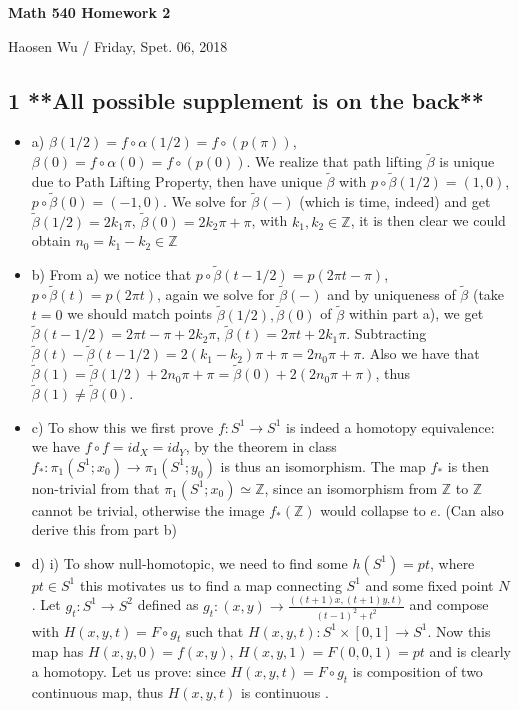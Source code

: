 \documentclass[11pt]{article}
\def\Z{{\mathbb Z}}
\theoremstyle{remark}
\begin{document}
\begin{center}
    \begin{Large} {\bf Math 540 Homework 2}\\
    \end{Large}
    Haosen Wu  / Friday, Spet. 06, 2018
\end{center}


\subsection*{1 **All possible supplement is on the back**}
\begin{itemize}
    \item a) $\beta(1/2)=f\circ \alpha(1/2)= f\circ (p(\pi))$, $\beta(0)=f\circ \alpha(0)= f\circ (p(0))$. We realize that path lifting $\tilde{\beta}$ is unique due to Path Lifting Property, then have unique $\tilde{\beta}$ with $p\circ \tilde{\beta}(1/2)= (1,0)$, $p\circ \tilde{\beta}(0)= (-1,0)$. We solve for $\tilde{\beta}(-)$ (which is time, indeed) and get $\tilde{\beta}(1/2)=2k_1\pi$, $\tilde{\beta}(0)=2k_2\pi+\pi$, with $k_1,k_2 \in \Z$, it is then clear we could obtain $n_0=k_1-k_2 \in \Z$
    
    \item b) From a) we notice that $p\circ \tilde{\beta}(t-1/2)= p(2\pi t-\pi)$, $p\circ \tilde{\beta}(t)= p(2\pi t)$, again we solve for $\tilde{\beta}(-)$ and by uniqueness of $\tilde{\beta}$ (take $t=0$ we should match points $\tilde{\beta}(1/2),\tilde{\beta}(0)$ of $\tilde{\beta}$ within part a), we get $\tilde{\beta}(t-1/2)=2\pi t-\pi+2k_2\pi$, $\tilde{\beta}(t)=2\pi t+2k_1\pi$. Subtracting $\tilde{\beta}(t)-\tilde{\beta}(t-1/2)=2(k_1-k_2)\pi+\pi = 2n_0\pi+\pi$. Also we have that $\tilde{\beta}(1)=\tilde{\beta}(1/2)+2n_0\pi+\pi=\tilde{\beta}(0)+2(2n_0\pi+\pi)$, thus $\tilde{\beta}(1)\neq\tilde{\beta}(0) $.
    
    \item c) To show this we first prove $f:S^1\rightarrow S^1$ is indeed a homotopy equivalence: we have $f\circ f = id_X = id_Y$,     by the theorem in class $f_*: \pi_1(S^1;x_0) \rightarrow \pi_1(S^1;y_0)$ is thus an isomorphism. The map $f_*$ is then non-trivial from that $\pi_1(S^1;x_0) \simeq \Z$, since an isomorphism from $\Z $ to $\Z $ cannot be trivial, otherwise the image $f_* (\Z) $  would collapse to {$e$}. (Can also derive this from part b)
    
    \item d) 
         i) To show null-homotopic, we need to find some $h(S^1)={pt}$, where $pt \in S^1$ this motivates us to find a map connecting $S^1$ and some fixed point $N$. Let $g_t:S^1\rightarrow S^2$ defined as $g_t:(x,y)\rightarrow \frac{((t+1)x,(t+1)y,t)}{(t-1)^2+t^2}$ and compose with $H(x,y,t)=F\circ g_t$ such that $H(x,y,t):S^1\times[0,1]\rightarrow S^1$. Now this map has $H(x,y,0)=f(x,y)$, $H(x,y,1)=F(0,0,1)={pt}$ and is clearly a homotopy. Let us prove: since $H(x,y,t)=F\circ g_t$ is composition of two continuous map, thus $H(x,y,t)$ is continuous .
        

\end{itemize}
\end{document}
